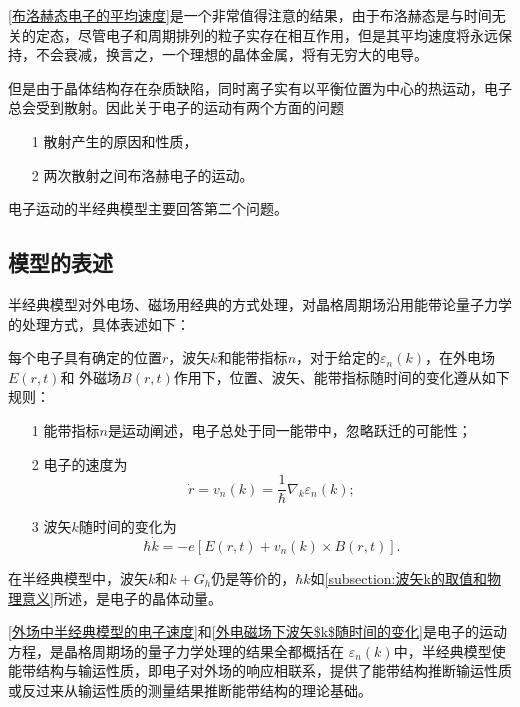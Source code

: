         \autoref{布洛赫态电子的平均速度}是一个非常值得注意的结果，由于布洛赫态是与时间无关的定态，尽管电子和周期排列的粒子实存在相互作用，但是其平均速度将永远保持，不会衰减，换言之，一个理想的晶体金属，将有无穷大的电导。

        但是由于晶体结构存在杂质缺陷，同时离子实有以平衡位置为中心的热运动，电子总会受到散射。因此关于电子的运动有两个方面的问题
        \begin{itemize}
            \item[1] 散射产生的原因和性质，
            \item[2] 两次散射之间布洛赫电子的运动。
        \end{itemize}
        电子运动的半经典模型主要回答第二个问题。

        \subsection{模型的表述}
            半经典模型对外电场、磁场用经典的方式处理，对晶格周期场沿用能带论量子力学的处理方式，具体表述如下：
            
            每个电子具有确定的位置$r$，波矢$k$和能带指标$n$，对于给定的$\varepsilon_n(k)$，在外电场$E(r,t)$和
            外磁场$B(r,t)$作用下，位置、波矢、能带指标随时间的变化遵从如下规则：
            \begin{itemize}
                \item[1] 能带指标$n$是运动阐述，电子总处于同一能带中，忽略跃迁的可能性；
                \item[2] 电子的速度为
                            \begin{equation}
                                \dot{r}=v_n(k)=\frac{1}{\hbar}\nabla_k\varepsilon_n(k)\label{外场中半经典模型的电子速度};
                            \end{equation}
                \item[3] 波矢$k$随时间的变化为
                            \begin{equation}
                                \hbar\dot{k}=-e\left[ E(r,t)+v_n(k)\times B(r,t) \right]\label{外电磁场下波矢$k$随时间的变化}.
                            \end{equation}
            \end{itemize}
            
            在半经典模型中，波矢$k$和$k+G_h$仍是等价的，$\hbar k$如\autoref{subsection:波矢k的取值和物理意义}所述，是电子的晶体动量。

            \autoref{外场中半经典模型的电子速度}和\autoref{外电磁场下波矢$k$随时间的变化}是电子的运动方程，是晶格周期场的量子力学处理的结果全都概括在
            $\varepsilon_n(k)$中，半经典模型使能带结构与输运性质，即电子对外场的响应相联系，提供了能带结构推断输运性质或反过来从输运性质的测量结果推断能带结构的理论基础。


